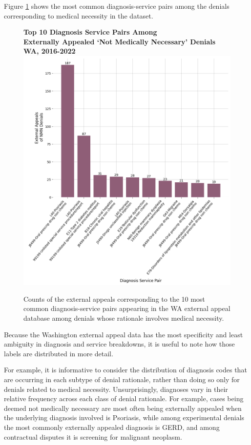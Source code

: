 \documentclass[12pt, a4paper,twoside,parskip=full]{report}
\theoremstyle{plain} %
\theoremstyle{definition} %
\theoremstyle{remark} %
\numberwithin{equation}{chapter}
\begin{document}
		Figure \ref{wanmnexternalappealdiagservice} shows the most common diagnosis-service pairs among the denials corresponding to medical necessity in the dataset.
		
		\begin{figure}[h!]
			\centering
			\textbf{Top 10 Diagnosis Service Pairs Among}\\ 
			\textbf{Externally Appealed `Not Medically Necessary' Denials}\\ 
			\textbf{WA, 2016-2022}\\
			\includegraphics[width=.8\textwidth]{images/wa_external_appeals/top_nmn_appeal_diag_service.png}
			\caption{Counts of the external appeals corresponding to the 10 most common diagnosis-service pairs appearing in the WA external appeal database among denials whose rationale involves medical necessity.}
			\label{wanmnexternalappealdiagservice}
		\end{figure}
	\clearpage
	
		Because the Washington external appeal data has the most specificity and least ambiguity in diagnosis and service breakdowns, it is useful to note how those labels are distributed in more detail.
		
		For example, it is informative to consider the distribution of diagnosis codes that are occurring in each subtype of denial rationale, rather than doing so only for denials related to medical necessity. Unsurprisingly, diagnoses vary in their relative frequency across each class of denial rationale. For example, cases being deemed not medically necessary are most often being externally appealed when the underlying diagnosis involved is Psoriasis, while among experimental denials the most commonly externally appealed diagnosis is GERD, and among contractual disputes it is screening for malignant neoplasm.
		
\end{document}
